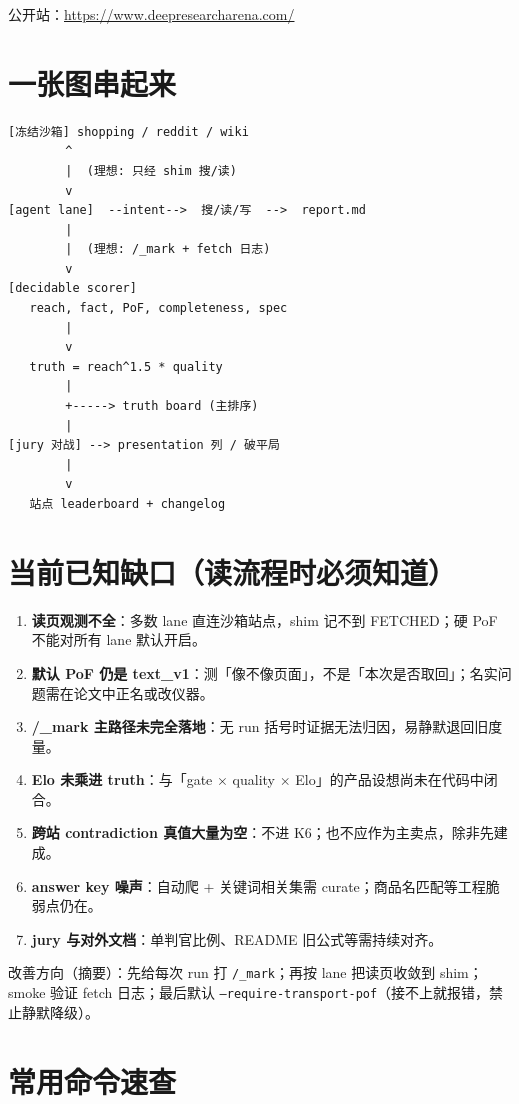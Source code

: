 \documentclass[11pt,a4paper]{article}
\begin{document}
公开站：\url{https://www.deepresearcharena.com/}

\section{一张图串起来}

\begin{lstlisting}
[冻结沙箱] shopping / reddit / wiki
        ^
        |  (理想: 只经 shim 搜/读)
        v
[agent lane]  --intent-->  搜/读/写  -->  report.md
        |
        |  (理想: /_mark + fetch 日志)
        v
[decidable scorer]
   reach, fact, PoF, completeness, spec
        |
        v
   truth = reach^1.5 * quality
        |
        +-----> truth board (主排序)
        |
[jury 对战] --> presentation 列 / 破平局
        |
        v
   站点 leaderboard + changelog
\end{lstlisting}

\section{当前已知缺口（读流程时必须知道）}

\begin{enumerate}[leftmargin=1.8em]
  \item \textbf{读页观测不全}：多数 lane 直连沙箱站点，shim 记不到 FETCHED；硬 PoF 不能对所有 lane 默认开启。
  \item \textbf{默认 PoF 仍是 text\_v1}：测「像不像页面」，不是「本次是否取回」；名实问题需在论文中正名或改仪器。
  \item \textbf{/\_mark 主路径未完全落地}：无 run 括号时证据无法归因，易静默退回旧度量。
  \item \textbf{Elo 未乘进 truth}：与「gate $\times$ quality $\times$ Elo」的产品设想尚未在代码中闭合。
  \item \textbf{跨站 contradiction 真值大量为空}：不进 K6；也不应作为主卖点，除非先建成。
  \item \textbf{answer key 噪声}：自动爬 + 关键词相关集需 curate；商品名匹配等工程脆弱点仍在。
  \item \textbf{jury 与对外文档}：单判官比例、README 旧公式等需持续对齐。
\end{enumerate}

改善方向（摘要）：先给每次 run 打 \texttt{/\_mark}；再按 lane 把读页收敛到 shim；smoke 验证 fetch 日志；最后默认 \texttt{--require-transport-pof}（接不上就报错，禁止静默降级）。

\section{常用命令速查}
\end{document}
